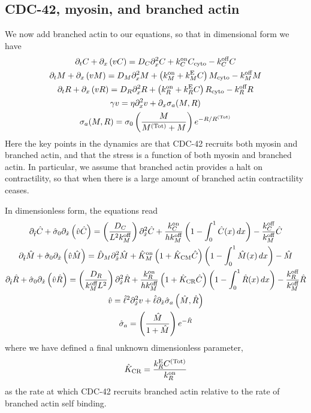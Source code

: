\documentclass[11pt]{article}
\newcommand{\6}[1]{#1_{\text{6}}}
\newcommand{\3}[1]{#1_{\text{3}}}
\newcommand{\Tot}[1]{#1^\text{(Tot)}}
\newcommand{\C}[1]{#1_C}
\newcommand{\My}[1]{#1_M}
\newcommand{\R}[1]{#1_R}
\begin{document}
\subsection{CDC-42, myosin, and branched actin}
We now add branched actin to our equations, so that in dimensional form we have
\begin{subequations}
\begin{gather}
\Dt C + \Dx \left(v C\right) = D_C \Dx^2 C +\C{\kon}C_\text{cyto} - \C{\koff} C \\
\Dt M + \Dx \left(v M\right) = D_M \Dx^2 M +\left(\My{\kon}+\My{\kE}C\right) M_\text{cyto} - \My{\koff} M\\
\Dt R + \Dx \left(v R\right) = D_R \Dx^2 R+ \left(\R{\kon} + \R{\kE}C \right) R_\text{cyto} - \R{\koff} R\\
\gamma v = \eta \Dx^2 v + \Dx \sigma_a(M,R) \\
\sigma_a(M,R)=\sigma_0 \left(\frac{M}{\Tot{M}+M}\right)e^{-R/\Tot{R}}
\end{gather}
\end{subequations}
Here the key points in the dynamics are that CDC-42 recruits both myosin and branched actin, and that the stress is a function of both myosin and branched actin. In particular, we assume that branched actin provides a halt on contractility, so that when there is a large amount of branched actin contractility ceases.

In dimensionless form, the equations read 
\begin{subequations}
\label{eq:NDBA}
\begin{gather}
\Dthat \hat{C} +\hat{\sigma}_0  \Dxhat \left(\hat{v} \hat{C} \right) =\left(\frac{\C{D}}{L^2 \My{\koff}}\right) \Dxhat^2 \hat{C}+\frac{\C{\kon}}{h \My{\koff}}\left(1-\int_0^1  \hat{C}(x) \, dx\right)-\frac{\C{\koff}}{\My{\koff}} \hat{C}\\
\Dthat \hat{M} +\hat{\sigma}_0  \Dxhat \left(\hat{v} \hat{M} \right) =\hat{D}_M \Dxhat^2 \hat{M} +\hat{K}^\text{on}_M\left(1+\hat{K}_\text{CM}\hat{C}\right) \left(1-\int_0^1  \hat{M}(x) \, dx\right) - \hat{M}\\
\Dthat \hat{R} +\hat{\sigma}_0    \Dxhat \left(\hat{v} \hat{R}\right) = \left(\frac{D_R}{\My{\koff}L^2}\right) \Dxhat^2 \hat{R}+ \frac{\R{\kon}}{h \My{\koff}} \left(1 + \hat{K}_\text{CR}\hat{C} \right)\left(1-\int_0^1  \hat{R}(x) \, dx\right) - \frac{\R{\koff}}{\My{\koff}} \hat R\\ \nonumber
\hat{v} = \hat{\ell}^2 \Dxhat^2 v +\hat{\ell} \Dxhat \hat{\sigma}_a\left(\hat{M},\hat{R}\right)\\
\hat{\sigma}_a = \left(\frac{\hat{M}}{1+\hat{M}} \right) e^{-\hat{R}}
\end{gather}
\end{subequations}
where we have defined a final unknown dimensionless parameter, 
\begin{equation}
\hat{K}_\text{CR}= \frac{\R{\kE}\Tot{C}}{\R{\kon}}
\end{equation}
as the rate at which CDC-42 recruits branched actin relative to the rate of branched actin self binding.
\end{document}
